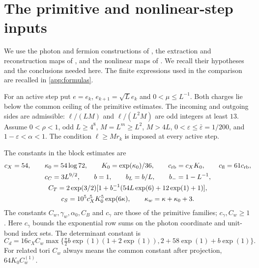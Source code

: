 \section{The primitive and nonlinear-step inputs}\label{sec:inputs}

We use the photon and fermion constructions of
\cite{MaxwellBlockManuscript,FermionBlockManuscript}, the extraction
and reconstruction maps of \cite{NormalizedContraction}, and the
nonlinear maps of \cite{NonlinearStep}.
We recall their hypotheses and the conclusions needed here.
The finite expressions used in the comparison are recalled in \cref{app:formulas}.

For an active step put \(e=e_k\), \(e_{k+1}=\sqrt L e_k\) and
\(0<\mu\le L^{-1}\). Both charges lie below the common ceiling of the
primitive estimates. The incoming and outgoing sides are admissible:
\(\ell/(LM)\) and \(\ell/(L^2M)\) are odd integers at least \(13\).
Assume \(0<\rho<1\), odd \(L\ge4^8\),
\(M=L^m\ge L^2\), \(M>4L\),
\(0<\varepsilon\le\bar\varepsilon=1/200\), and
\(1-\varepsilon<\alpha<1\). The condition \(\ell\ge Mr_k\)
is imposed at every active step.

The constants in the block estimates are
\[
 \begin{gathered}
 c_X=54,\qquad \kappa_0=54\log72,\qquad K_0=\exp(\kappa_0)/36,\qquad
 c_{\rm rb}=c_XK_0,\qquad c_{\rm fl}=61c_{\rm rb},\\
 c_C=3L^{9/2},\qquad b=1,\qquad b_L=b/L,\qquad b_-=1-L^{-1},\\
 C_T=2\exp(3/2)
       [1+b_-^{-1}(54L\exp(6)+12\exp(1)+1)],\\
 c_S=10^5c_X^5K_0^5\exp(6\kappa),\qquad
 \kappa_w=\kappa+\kappa_0+3.
 \end{gathered}
\]
The constants \(C_w,\gamma_w,\alpha_0,C_B\) and \(c_\gamma\) are those
of the primitive families; \(c_\gamma,C_w\ge1\).
Here \(c_\gamma\) bounds the exponential row sums on the photon
coordinate and unit-bond index sets. The determinant constant is
\[
 C_d=16c_XC_w\max\{\tfrac\pi2 b\exp(1)(1+2\exp(1)),
                         2+58\exp(1)+b\exp(1)\}.
\]
For related tori \(C_w\) always means the common constant after
projection, \(64K_0C_w^{(1)}\).

